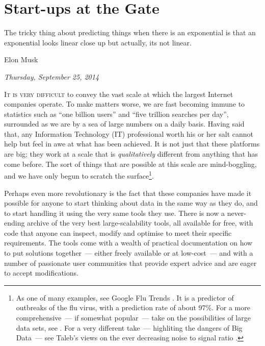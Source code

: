 \documentclass{book}
\begin{document}
\chapter{Start-ups at the Gate}

\epigraph{The tricky thing about predicting things when there is an
  exponential is that an exponential looks linear close up but
  actually, its not linear.}{Elon Musk}

\begin{flushright}
  \emph{Thursday, September 25, 2014}
\end{flushright}

\lettrine{I}{t is very difficult} to convey the vast scale at which
the largest Internet companies operate. To make matters worse, we are
fast becoming immune to statistics such as ``one billion
users''\cite{Mashable01} and ``five trillion searches per
day''\cite{StatisticsBrain01}, surrounded as we are by a sea of large
numbers on a daily basis. Having said that, any Information Technology
(IT) professional worth his or her salt cannot help but feel in awe at
what has been achieved. It is not just that these platforms are big;
they work at a scale that is \emph{qualitatively} different from
anything that has come before. The sort of things that are possible at
this scale are mind-boggling, and we have only begun to scratch the
surface\footnote{As one of many examples, see Google Flu Trends
  \cite{Wikipedia02}. It is a predictor of outbreaks of the flu virus,
  with a prediction rate of about 97\%. For a more comprehensive~---
  if somewhat popular~--- take on the possibilities of large data
  sets, see \cite{Cukier01}. For a very different take~--- highliting
  the dangers of Big Data~--- see Taleb's views on the ever decreasing
  noise to signal ratio \cite{Taleb01}.}.

Perhaps even more revolutionary is the fact that these companies have
made it possible for anyone to start thinking about data in the same
way as they do, and to start handling it using the very same tools
they use. There is now a never-ending archive of the very best
large-scalability tools, all available for free, with code that anyone
can inspect, modify and optimise to meet their specific
requirements. The tools come with a wealth of practical documentation
on how to put solutions together~--- either freely available or at
low-cost~--- and with a number of passionate user communities that
provide expert advice and are eager to accept modifications.
\end{document}
